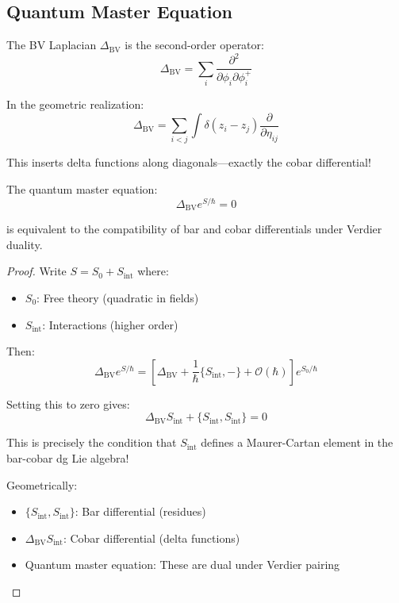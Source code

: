 \subsection{Quantum Master Equation}

\begin{definition}[BV Laplacian]
The BV Laplacian $\Delta_{\text{BV}}$ is the second-order operator:
$$\Delta_{\text{BV}} = \sum_i \frac{\partial^2}{\partial \phi_i \partial \phi_i^+}$$

In the geometric realization:
$$\Delta_{\text{BV}} = \sum_{i<j} \int \delta(z_i - z_j) 
\frac{\partial}{\partial \eta_{ij}}$$

This inserts delta functions along diagonals—exactly the cobar differential!
\end{definition}

\begin{theorem}[Quantum Master Equation = Bar-Cobar Duality]
The quantum master equation:
$$\Delta_{\text{BV}} e^{S/\hbar} = 0$$

is equivalent to the compatibility of bar and cobar differentials under Verdier 
duality.
\end{theorem}

\begin{proof}
Write $S = S_0 + S_{\text{int}}$ where:
\begin{itemize}
\item $S_0$: Free theory (quadratic in fields)
\item $S_{\text{int}}$: Interactions (higher order)
\end{itemize}

Then:
$$\Delta_{\text{BV}} e^{S/\hbar} = \left[\Delta_{\text{BV}} + 
\frac{1}{\hbar}\{S_{\text{int}}, -\} + \mathcal{O}(\hbar)\right] e^{S_0/\hbar}$$

Setting this to zero gives:
$$\Delta_{\text{BV}} S_{\text{int}} + \{S_{\text{int}}, S_{\text{int}}\} = 0$$

This is precisely the condition that $S_{\text{int}}$ defines a Maurer-Cartan 
element in the bar-cobar dg Lie algebra!

Geometrically:
\begin{itemize}
\item $\{S_{\text{int}}, S_{\text{int}}\}$: Bar differential (residues)
\item $\Delta_{\text{BV}} S_{\text{int}}$: Cobar differential (delta functions)
\item Quantum master equation: These are dual under Verdier pairing
\end{itemize}
\end{proof}

